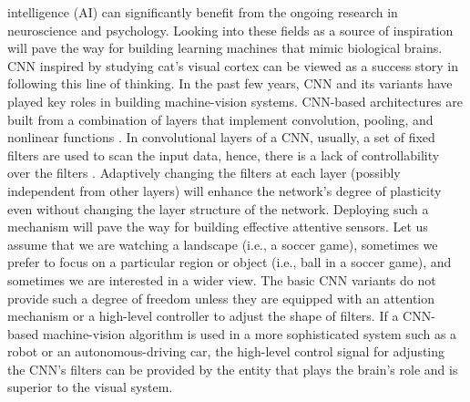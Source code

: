 \documentclass[journal]{IEEEtran}
\begin{document}
  intelligence (AI) can significantly benefit from the ongoing research in neuroscience and psychology. Looking into these fields as a source of inspiration will pave the way for building learning machines that mimic biological brains. CNN inspired by studying cat's visual cortex can be viewed as a success story in following this line of thinking. In the past few years, CNN and its variants have played key roles in building machine-vision systems. CNN-based architectures are built from a combination of layers that implement convolution, pooling, and nonlinear functions \cite{goodfellow2016deep}. In convolutional layers of a CNN, usually, a set of fixed filters are used to scan the input data, hence, there is a lack of controllability over the filters \cite{wu2017introduction}. Adaptively changing the filters at each layer (possibly independent from other layers) will enhance the network's degree of plasticity even without changing the layer structure of the network. Deploying such a mechanism will pave the way for building effective attentive sensors. Let us assume that we are watching a landscape (i.e., a soccer game), sometimes we prefer to focus on a particular region or object (i.e., ball in a soccer game), and sometimes we are interested in a wider view. The basic CNN variants do not provide such a degree of freedom unless they are equipped with an attention mechanism \cite{vaswani2017attention,bello2019attention} or a high-level controller to adjust the shape of filters. If a CNN-based machine-vision algorithm is used in a more sophisticated system such as a robot or an autonomous-driving car, the high-level control signal for adjusting the CNN's filters can be provided by the entity that plays the brain's role and is superior to the visual system.
\end{document}
